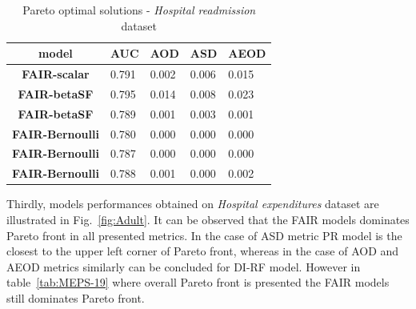 \documentclass[preprint,12pt]{elsarticle}
\begin{document}
\begin{table}
	\centering
	\caption{Pareto optimal solutions - \textit{Hospital readmission} dataset}
	\begin{tabular}{|c|l|l|l|l|}
		\hline
		\textbf{model}          & \multicolumn{1}{c|}{\textbf{AUC}} & \multicolumn{1}{c|}{\textbf{AOD}} & \multicolumn{1}{c|}{\textbf{ASD}} & \multicolumn{1}{c|}{\textbf{AEOD}} \\ \hline
		\textbf{FAIR-scalar}    & 0.791                             & 0.002                             & 0.006                             & 0.015                              \\ \hline
		\textbf{FAIR-betaSF}    & 0.795                             & 0.014                             & 0.008                             & 0.023                              \\ \hline
		\textbf{FAIR-betaSF}    & 0.789                             & 0.001                             & 0.003                             & 0.001                              \\ \hline
		\textbf{FAIR-Bernoulli} & 0.780                             & 0.000                             & 0.000                             & 0.000                              \\ \hline
		\textbf{FAIR-Bernoulli} & 0.787                             & 0.000                             & 0.000                             & 0.000                              \\ \hline
		\textbf{FAIR-Bernoulli} & 0.788                             & 0.001                             & 0.000                             & 0.002                              \\ \hline
	\end{tabular}
	\label{tab:Readmission}%
\end{table}

Thirdly, models performances obtained on \textit{Hospital expenditures} dataset are illustrated in Fig.~\ref{fig:Adult}. It can be observed that the FAIR models dominates Pareto front in all presented metrics. In the case of ASD metric PR model is the closest to the upper left corner of Pareto front, whereas in the case of AOD and AEOD metrics similarly can be concluded for DI-RF model. However in table~\ref{tab:MEPS-19} where overall Pareto front is presented the FAIR models still dominates Pareto front.
\end{document}
